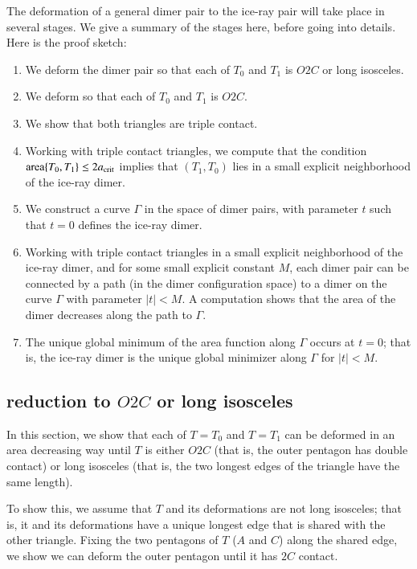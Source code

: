The deformation of a general dimer pair to the ice-ray pair will take
place in several stages.  We give a summary of the stages here, before
going into details.  Here is the proof sketch:

\begin{enumerate}
\item We deform the dimer pair so that each of $T_0$ and $T_1$ is $O2C$
or long isosceles.
\item We deform so that each of $T_0$ and $T_1$ is $O2C$.
\item We show that both triangles are triple contact.
\item Working with triple contact triangles, we compute that the
  condition ${\operatorname{area}}\{T_0,T_1\}\le 2a_\text{crit}$ implies that $(T_1,T_0)$
  lies in a small explicit neighborhood of the ice-ray dimer.
\item We construct a curve $\Gamma$ in the space of dimer pairs, with
  parameter $t$ such that $t=0$ defines the ice-ray dimer.
\item Working with triple contact triangles in a small explicit
  neighborhood of the ice-ray dimer, and for some small explicit
  constant $M$, each dimer pair can be connected by a path (in the
  dimer configuration space) to a dimer on the curve $\Gamma$ with
  parameter $|t|<M$.  A computation shows that the area of the dimer
  decreases along the path to $\Gamma$.
\item The unique global minimum of the area function along $\Gamma$
  occurs at $t=0$; that is, the ice-ray dimer is the unique global
  minimizer along $\Gamma$ for $|t|<M$.
\end{enumerate}

\subsection{reduction to $O2C$ or long isosceles}

In this section, we show that each of $T=T_0$ and $T=T_1$ can be
deformed in an area decreasing way until $T$ is either $O2C$ (that is,
the outer pentagon has double contact) or long isosceles (that is, the
two longest edges of the triangle have the same length).

To show this, we assume that $T$ and its deformations are not long
isosceles; that is, it and its deformations have a unique longest edge
that is shared with the other triangle.  Fixing the two pentagons of
$T$ ($A$ and $C$) along the shared edge, we show we can deform the
outer pentagon until it has $2C$ contact.

